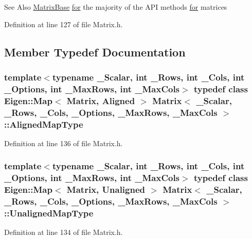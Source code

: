 \begin{DoxySeeAlso}{See Also}
\hyperlink{class_matrix_base}{Matrix\-Base} \hyperlink{crypt_8h_a6f9c0aaf91aa1ee6f13a43244e90af87}{for} the majority of the A\-P\-I methods \hyperlink{crypt_8h_a6f9c0aaf91aa1ee6f13a43244e90af87}{for} matrices 
\end{DoxySeeAlso}


Definition at line 127 of file Matrix.\-h.



\subsection{Member Typedef Documentation}
\hypertarget{class_matrix_a8fbe7258317b503b5426051cc5602e5f}{
\subsubsection[{Aligned\-Map\-Type}]{\setlength{\rightskip}{0pt plus 5cm}template$<$typename \-\_\-\-Scalar, int \-\_\-\-Rows, int \-\_\-\-Cols, int \-\_\-\-Options, int \-\_\-\-Max\-Rows, int \-\_\-\-Max\-Cols$>$ typedef class Eigen\-::\-Map$<$ {\bf Matrix}, {\bf Aligned} $>$ {\bf Matrix}$<$ \-\_\-\-Scalar, \-\_\-\-Rows, \-\_\-\-Cols, \-\_\-\-Options, \-\_\-\-Max\-Rows, \-\_\-\-Max\-Cols $>$\-::{\bf Aligned\-Map\-Type}}}\label{class_matrix_a8fbe7258317b503b5426051cc5602e5f}


Definition at line 136 of file Matrix.\-h.

\hypertarget{class_matrix_a351013142295ee30707ec0025633dcde}{
\subsubsection[{Unaligned\-Map\-Type}]{\setlength{\rightskip}{0pt plus 5cm}template$<$typename \-\_\-\-Scalar, int \-\_\-\-Rows, int \-\_\-\-Cols, int \-\_\-\-Options, int \-\_\-\-Max\-Rows, int \-\_\-\-Max\-Cols$>$ typedef class Eigen\-::\-Map$<$ {\bf Matrix}, {\bf Unaligned} $>$ {\bf Matrix}$<$ \-\_\-\-Scalar, \-\_\-\-Rows, \-\_\-\-Cols, \-\_\-\-Options, \-\_\-\-Max\-Rows, \-\_\-\-Max\-Cols $>$\-::{\bf Unaligned\-Map\-Type}}}\label{class_matrix_a351013142295ee30707ec0025633dcde}


Definition at line 134 of file Matrix.\-h.




